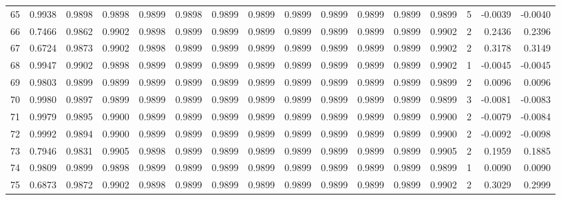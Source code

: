 \begin{tabular}{lrrrrrrrrrrrrrrr}
65  &      0.9938 &  0.9898 &  0.9898 &  0.9899 &  0.9898 &  0.9899 &  0.9899 &  0.9899 &  0.9899 &  0.9899 &   0.9899 &     0.9899 &      5 &                   -0.0039 &                    -0.0040 \\
66  &      0.7466 &  0.9862 &  0.9902 &  0.9898 &  0.9899 &  0.9899 &  0.9899 &  0.9899 &  0.9899 &  0.9899 &   0.9899 &     0.9902 &      2 &                    0.2436 &                     0.2396 \\
67  &      0.6724 &  0.9873 &  0.9902 &  0.9898 &  0.9899 &  0.9899 &  0.9899 &  0.9899 &  0.9899 &  0.9899 &   0.9899 &     0.9902 &      2 &                    0.3178 &                     0.3149 \\
68  &      0.9947 &  0.9902 &  0.9898 &  0.9899 &  0.9899 &  0.9899 &  0.9899 &  0.9899 &  0.9899 &  0.9899 &   0.9899 &     0.9902 &      1 &                   -0.0045 &                    -0.0045 \\
69  &      0.9803 &  0.9899 &  0.9899 &  0.9899 &  0.9899 &  0.9899 &  0.9899 &  0.9899 &  0.9899 &  0.9899 &   0.9899 &     0.9899 &      2 &                    0.0096 &                     0.0096 \\
70  &      0.9980 &  0.9897 &  0.9899 &  0.9899 &  0.9899 &  0.9899 &  0.9899 &  0.9899 &  0.9899 &  0.9899 &   0.9899 &     0.9899 &      3 &                   -0.0081 &                    -0.0083 \\
71  &      0.9979 &  0.9895 &  0.9900 &  0.9899 &  0.9899 &  0.9899 &  0.9899 &  0.9899 &  0.9899 &  0.9899 &   0.9899 &     0.9900 &      2 &                   -0.0079 &                    -0.0084 \\
72  &      0.9992 &  0.9894 &  0.9900 &  0.9899 &  0.9899 &  0.9899 &  0.9899 &  0.9899 &  0.9899 &  0.9899 &   0.9899 &     0.9900 &      2 &                   -0.0092 &                    -0.0098 \\
73  &      0.7946 &  0.9831 &  0.9905 &  0.9898 &  0.9899 &  0.9899 &  0.9899 &  0.9899 &  0.9899 &  0.9899 &   0.9899 &     0.9905 &      2 &                    0.1959 &                     0.1885 \\
74  &      0.9809 &  0.9899 &  0.9898 &  0.9899 &  0.9899 &  0.9899 &  0.9899 &  0.9899 &  0.9899 &  0.9899 &   0.9899 &     0.9899 &      1 &                    0.0090 &                     0.0090 \\
75  &      0.6873 &  0.9872 &  0.9902 &  0.9898 &  0.9899 &  0.9899 &  0.9899 &  0.9899 &  0.9899 &  0.9899 &   0.9899 &     0.9902 &      2 &                    0.3029 &                     0.2999 \\

\end{tabular}
